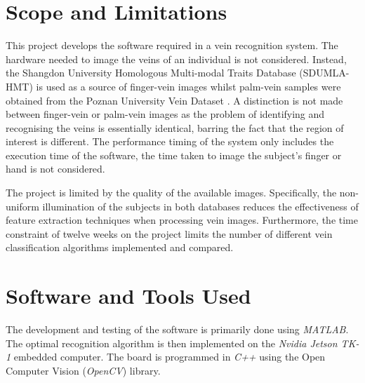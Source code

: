 \section{Scope and Limitations}
This project develops the software required in a vein recognition system. The hardware needed to image the veins of an individual is not considered. Instead, the Shangdon University Homologous Multi-modal Traits Database (SDUMLA-HMT) \cite{Yin2011} is used as a source of finger-vein images whilst palm-vein samples were obtained from the Poznan University Vein Dataset \cite{Kabacinski2011}. A distinction is not made between finger-vein or palm-vein images as the problem of identifying and recognising the veins is essentially identical, barring the fact that the region of interest is different. The performance timing of the system only includes the execution time of the software, the time taken to image the subject's finger or hand is not considered. 
\par
The project is limited by the quality of the available images. Specifically, the non-uniform illumination of the subjects in both databases reduces the effectiveness of feature extraction techniques when processing vein images. Furthermore, the time constraint of twelve weeks on the project limits the number of different vein classification algorithms implemented and compared. 
\section{Software and Tools Used}
The development and testing of the software is primarily done using \textit{MATLAB}. The optimal recognition algorithm is then implemented on the \textit{Nvidia Jetson TK-1} embedded computer. The board is programmed in \textit{C++} using the Open Computer Vision (\textit{OpenCV}) library.   

